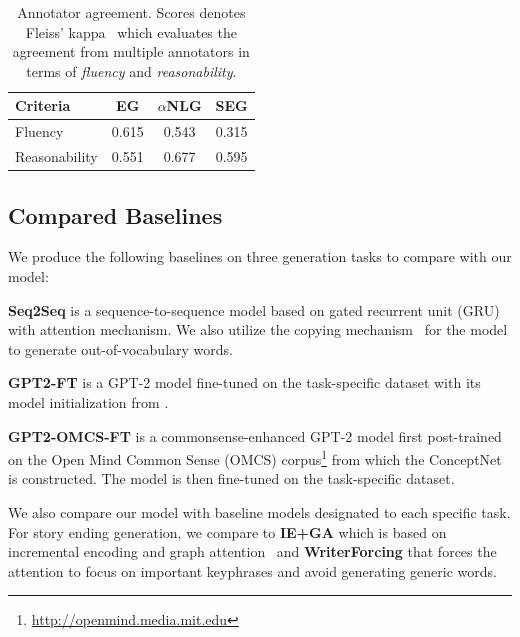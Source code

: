 \documentclass[11pt,a4paper]{article}
\begin{document}
\begin{table}[t]
    \centering
    \small
    \begin{tabular}{l c c c}
    \toprule[1.5pt]
    Criteria & \multicolumn{1}{c}{EG} & \multicolumn{1}{c}{$\alpha$NLG} & \multicolumn{1}{c}{SEG} \\
    \midrule[1pt]
    Fluency & 0.615 & 0.543 & 0.315\\
    Reasonability & 0.551 & 0.677 & 0.595 \\
    \bottomrule[1.5pt]
    \end{tabular}
    \caption{Annotator agreement. Scores denotes Fleiss' kappa~\citep{Fleiss1971MeasuringNS} which evaluates the agreement from multiple annotators in terms of \textit{fluency} and \textit{reasonability}.}
    \label{tab:agreement}
\end{table}

\subsection{Compared Baselines}
We produce the following baselines on three generation tasks to compare with our model:

\noindent\textbf{Seq2Seq} is a sequence-to-sequence model based on gated recurrent unit (GRU) with attention mechanism. We also utilize the copying mechanism~\citep{Gu2016IncorporatingCM} for the model to generate out-of-vocabulary words.


\noindent\textbf{GPT2-FT} is a GPT-2 model fine-tuned on the task-specific dataset with its model initialization from \citet{Radford2019LanguageMA}.

\noindent\textbf{GPT2-OMCS-FT} is a commonsense-enhanced GPT-2 model first post-trained on the Open Mind Common Sense (OMCS) corpus\footnote{\url{http://openmind.media.mit.edu}} from which the ConceptNet is constructed. The model is then fine-tuned on the task-specific dataset.

We also compare our model with baseline models designated to each specific task. For story ending generation, we compare to \textbf{IE+GA} which is based on incremental encoding and graph attention~\citep{Guan2019StoryEG} and \textbf{WriterForcing} that forces the attention to focus on important keyphrases and avoid generating generic words. 
\end{document}
